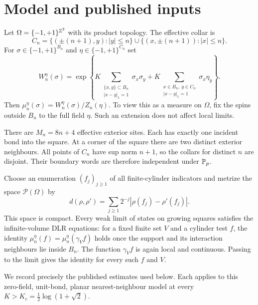 \section{Model and published inputs}\label{sec:model}
\begin{definition}
Let $\Omega=\{-1,+1\}^{\mathbb Z^2}$ with its product topology. The effective collar is
\[
 C_n=\{(\pm(n+1),y):|y|\le n\}\cup
       \{(x,\pm(n+1)):|x|\le n\}.
\]
For $\sigma\in\{-1,+1\}^{B_n}$ and $\eta\in\{-1,+1\}^{C_n}$ set
\[
 W_n^\eta(\sigma)=\exp\left\{K\!\sum_{\substack{\{x,y\}\subset B_n\\|x-y|_1=1}}\sigma_x\sigma_y
 +K\!\sum_{\substack{x\in B_n,\ y\in C_n\\|x-y|_1=1}}\sigma_x\eta_y\right\}.
\]
Then $\mu_n^\eta(\sigma)=W_n^\eta(\sigma)/Z_n(\eta)$. To view this as a measure on $\Omega$, fix the spins outside $B_n$ to the full field $\eta$. Such an extension does not affect local limits.
\end{definition}
There are $M_n=8n+4$ effective exterior sites. Each has exactly one incident bond into the square. At a corner of the square there are two distinct exterior neighbours. All points of $C_n$ have sup norm $n+1$, so the collars for distinct $n$ are disjoint. Their boundary words are therefore independent under $\mathbb P_p$.

Choose an enumeration $(f_j)_{j\ge1}$ of all finite-cylinder indicators and metrize the space $\mathcal P(\Omega)$ by
\[
 d(\rho,\rho')=\sum_{j\ge1}2^{-j}|\rho(f_j)-\rho'(f_j)|.
\]
This space is compact. Every weak limit of states on growing squares satisfies the infinite-volume DLR equations: for a fixed finite set $V$ and a cylinder test $f$, the identity $\mu_n^\eta(f)=\mu_n^\eta(\gamma_V f)$ holds once the support and its interaction neighbours lie inside $B_n$. The function $\gamma_V f$ is again local and continuous. Passing to the limit gives the identity for every such $f$ and $V$.

We record precisely the published estimates used below. Each applies to this zero-field, unit-bond, planar nearest-neighbour model at every $K>K_c=\tfrac12\log(1+\sqrt2)$.

